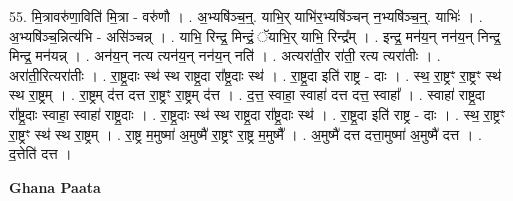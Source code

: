 \documentclass[17pt]{extarticle}
\begin{document}
55. मि॒त्रावरु॑णा॒विति॑ मि॒त्रा - वरु॑णौ । . अ॒भ्यषि॑ञ्च॒न्॒. याभि॒र् याभि॑र॒भ्यषि॑ञ्चन् न॒भ्यषि॑ञ्च॒न्॒. याभिः॑ । . अ॒भ्यषि॑ञ्च॒न्नित्य॑भि - असि॑ञ्चन्न् । . याभि॒ रिन्द्र॒ मिन्द्रं॒ ॅयाभि॒र् याभि॒ रिन्द्र᳚म् । . इन्द्र॒ मन॑य॒न् नन॑य॒न् निन्द्र॒ मिन्द्र॒ मन॑यन्न् । . अन॑य॒न् नत्य त्यन॑य॒न् नन॑य॒न् नति॑ । . अत्यरा॑ती॒र रा॑ती॒ रत्य त्यरा॑तीः । . अरा॑ती॒रित्यरा॑तीः । . रा॒ष्ट्र॒दाः स्थ॑ स्थ राष्ट्र॒दा रा᳚ष्ट्र॒दाः स्थ॑ । . रा॒ष्ट्र॒दा इति॑ राष्ट्र - दाः । . स्थ॒ रा॒ष्ट्रꣳ रा॒ष्ट्रꣳ स्थ॑ स्थ रा॒ष्ट्रम् । . रा॒ष्ट्रम् द॑त्त दत्त रा॒ष्ट्रꣳ रा॒ष्ट्रम् द॑त्त । . द॒त्त॒ स्वाहा॒ स्वाहा॑ दत्त दत्त॒ स्वाहा᳚ । . स्वाहा॑ राष्ट्र॒दा रा᳚ष्ट्र॒दाः स्वाहा॒ स्वाहा॑ राष्ट्र॒दाः । . रा॒ष्ट्र॒दाः स्थ॑ स्थ राष्ट्र॒दा रा᳚ष्ट्र॒दाः स्थ॑ । . रा॒ष्ट्र॒दा इति॑ राष्ट्र - दाः । . स्थ॒ रा॒ष्ट्रꣳ रा॒ष्ट्रꣳ स्थ॑ स्थ रा॒ष्ट्रम् । . रा॒ष्ट्र म॒मुष्मा॑ अ॒मुष्मै॑ रा॒ष्ट्रꣳ रा॒ष्ट्र म॒मुष्मै᳚ । . अ॒मुष्मै॑ दत्त दत्ता॒मुष्मा॑ अ॒मुष्मै॑ दत्त । . द॒त्तेति॑ दत्त । \newline

\textbf{Ghana Paata } \newline
\end{document}
